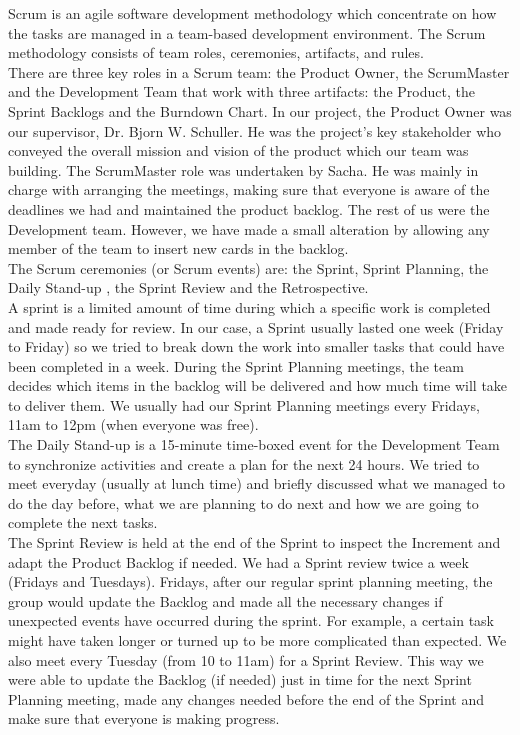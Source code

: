 \documentclass{article}
\begin{document}
Scrum is an agile software development methodology which concentrate on how the tasks are managed in a team-based development environment. The Scrum methodology consists of team roles, ceremonies, artifacts, and rules. \\

There are three key roles in a Scrum team: the Product Owner, the ScrumMaster and the Development Team that work with three artifacts: the Product, the Sprint Backlogs and the Burndown Chart. In our project, the Product Owner was our supervisor, Dr. Bjorn W. Schuller. He was the project’s key stakeholder who conveyed the overall mission and vision of the product which our team was building. The ScrumMaster role was undertaken by Sacha. He was mainly in charge with arranging the meetings, making sure that everyone is aware of the deadlines we had and maintained the product backlog. The rest of us were the Development team. However, we have made a small alteration by allowing any member of the team to insert new cards in the backlog. \\

The Scrum ceremonies (or Scrum events) are: the Sprint, Sprint Planning, the Daily Stand-up , the Sprint Review and the Retrospective. \\

A sprint is a limited amount of time during which a specific work is completed and made ready for review. In our case, a Sprint usually lasted one week (Friday to Friday) so we tried to break down the work into smaller tasks that could have been completed in a week.
During the Sprint Planning meetings, the  team decides which items in the backlog will be delivered and how much time will take to deliver them. We usually had our Sprint Planning meetings every Fridays, 11am to 12pm (when everyone was free). \\

The Daily Stand-up is a 15-minute time-boxed event for the Development Team to synchronize activities and create a plan for the next 24 hours. We tried to meet everyday (usually at lunch time) and briefly discussed what we managed to do the day before, what we are planning to do next and how we are going to complete the next tasks. \\

The Sprint Review is held at the end of the Sprint to inspect the Increment and adapt the Product Backlog if needed. We had a Sprint review twice a week (Fridays and Tuesdays). Fridays, after our regular sprint planning meeting, the group would update the Backlog and made all the necessary changes if unexpected events have occurred during the sprint. For example, a certain task might have taken longer or turned up to be more complicated than expected. We also meet every Tuesday (from 10 to 11am) for a Sprint Review. This way we were able to update the Backlog (if needed) just in time for the next Sprint Planning meeting, made any changes needed before the end of the Sprint and make sure that everyone is making progress. \\
\end{document}
